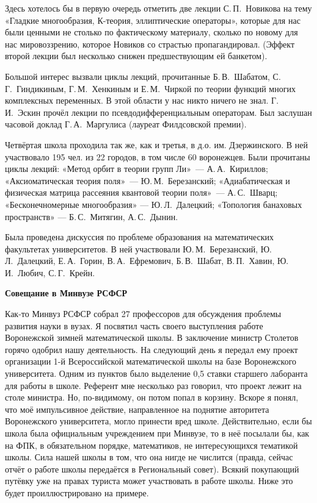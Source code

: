 Здесь хотелось бы в первую очередь отметить две лекции С.\,П.~Новикова на тему «Гладкие многообразия, К-теория, эллиптические операторы», которые для нас были ценными не столько по фактическому материалу, сколько по новому для нас мировоззрению, которое Новиков со страстью пропагандировал. (Эффект второй лекции был несколько снижен предшествующим ей банкетом).

Большой интерес вызвали циклы лекций,
прочитанные Б.\,В.~Шабатом, С.\,Г.~Гиндикиным,
Г.\,М.~Хенкиным и
\linebreak
Е.\,М.~Чиркой по теории функций многих комплексных переменных.
В этой области у нас никто ничего не знал.
Г.\,И.~Эскин прочёл лекции по псевдодифференциальным операторам. Был заслушан часовой доклад Г.\,А.~Маргулиса (лауреат Филдсовской премии).

Четвёртая школа проходила так же, как и третья, в д.о. им. Дзержинского.
В ней участвовало 195 чел. из 22 городов, в том числе 60 воронежцев.
Были прочитаны циклы лекций:
«Метод орбит в теории групп Ли»~--- А.\,А.~Кириллов;
«Аксиоматическая теория поля»~--- Ю.\,М.~Березанский;
«Адиабатическая и физическая матрица рассеяния квантовой теории поля»~--- А.\,С.~Шварц;
«Бесконечномерные многообразия» --- Ю.\,Л.~Далецкий;
«Топология банаховых пространств» --- Б.\,С.~Митягин, А.\,С.~Дынин.

Была проведена дискуссия по проблеме образования на математических факультетах университетов.
В ней участвовали Ю.\,М.~Березанский, Ю.\,Л.~Далецкий,
Е.\,А.~Горин, В.\,А.~Ефремович, Б.\,В.~Шабат, В.\,П.~Хавин, Ю.\,И.~Любич, С.\,Г.~Крейн.

{\bf Совещание в Минвузе РСФСР}

Как-то Минвуз РСФСР собрал 27 профессоров для обсуждения проблемы развития науки в вузах. Я посвятил часть своего выступления работе Воронежской зимней математической школы. В заключение министр Столетов горячо одобрил нашу деятельность. На следующий день я передал ему проект организации 1-й Всероссийской математической школы на базе Воронежского университета. Одним из пунктов было выделение 0,5 ставки старшего лаборанта для работы в школе. Референт мне несколько раз говорил, что проект лежит на столе министра. Но, по-видимому, он потом попал в корзину. Вскоре я понял, что моё импульсивное действие, направленное на поднятие авторитета Воронежского университета, могло принести вред школе. Действительно, если бы школа была официальным учреждением при Минвузе, то в неё посылали бы, как на ФПК, в обязательном порядке, математиков, не интересующихся тематикой школы. Сила нашей школы в том, что она нигде не числится (правда, сейчас отчёт о работе школы передаётся в Региональный совет). Всякий покупающий путёвку уже на правах туриста может участвовать в работе школы. Ниже это будет проиллюстрировано на примере.

